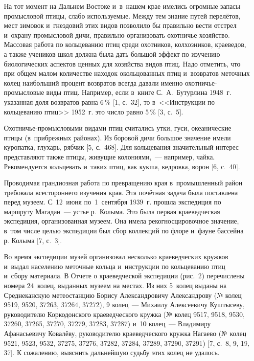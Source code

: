 На тот момент на Дальнем Востоке и~в~нашем крае имелись огромные запасы промысловой птицы, слабо используемые. Между тем знание путей перелётов, мест зимовок и~гнездовий этих видов позволило бы правильно вести отстрел и~охрану промысловой дичи, правильно организовать охотничье хозяйство. Массовая работа по кольцеванию птиц среди охотников, колхозников, краеведов, а также учеников школ должна была дать большой эффект по изучению биологических аспектов ценных для хозяйства видов птиц. Надо отметить, что при общем малом количестве находок окольцованных птиц и~возвратов меточных колец наибольший процент возвратов всегда давали именно охотничье-промысловые виды птиц. Например, если в~книге С.~А.~Бутурлина 1948~г. указанная доля возвратов равна 6\,\% [1, с.~32], то в~<<Инструкции по кольцеванию птиц>> 1952~г. это число равно 5\,\% [3, с.~5].

Охотничье-промысловыми видами птиц считались утки, гуси, океанические птицы (в~прибрежных районах). Из боровой дичи большое значение имели куропатка, глухарь, рябчик [5, с.~468]. Для кольцевания значительный интерес представляют также птицы, живущие колониями,~--- например, чайка. Рекомендуется кольцевать и~таких птиц, как кукша, кедровка, ворон [6, с.~40].

Проводимая грандиозная работа по превращению края в~промышленный район требовала всестороннего изучения края. Эта почётная задача была поставлена перед музеем. С~12~июня по~1~сентября 1939~г. прошла экспедиция по маршруту Магадан~--- устье р.~Колыма. Это была первая краеведческая экспедиция, организованная музеем. Она имела рекогносцировочное значение, в~том числе целью экспедиции был сбор коллекций по флоре и~фауне бассейна р. Колыма [7, с.~3].

Во время экспедиции музей организовал несколько краеведческих кружков и~выдал населению меточные кольца и~инструкции по кольцеванию птиц и~сбору материала. В Отчете о краеведческой экспедиции (рис.~2) перечислены номера 24~колец, выданных музеем на местах. Из них 5~колец выданы на Среднеканскую метеостанцию Борису Александровичу Александрову (№ колец 9519, 9520, 37263, 37264, 37272), 9 колец~--- Михаилу Алексеевичу Куштысеву, руководителю Коркодонского краеведческого кружка (№ колец 9517, 9518, 9530, 37260, 37265, 37270, 37279, 37283, 37287) и~10 колец~--- Владимиру Афанасьевичу Ковалёву, руководителю краеведческого кружка Нагаево (№ колец 9521, 9523, 9532, 37275, 37276, 37282, 37284, 37289, 37290, 37291) [7, с.~8, 9, 19, 37]. К сожалению, выяснить дальнейшую судьбу этих колец не удалось.

